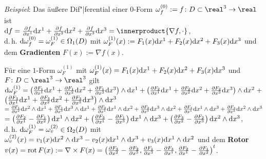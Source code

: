 \linie
\pagebreak

\emph{Beispiel}:
Das äußere Dif"|ferential einer $0$-Form
$\omega_f^{(0)} := f\colon D \subset \real^3 \rightarrow \real$ ist \\
$\d f = \frac{\partial f}{\partial x^1} \d x^1 +
\frac{\partial f}{\partial x^2} \d x^2 +
\frac{\partial f}{\partial x^3} \d x^3 = \innerproduct{\nabla f, \cdot}$, \\
d.\,h. $\mathrm{d} \omega_f^{(0)} = \omega_F^{(1)} \in \Omega_1(D)$ mit
$\omega_F^{(1)}(x) := F_1(x) \mathrm{d} x^1 + F_2(x) \mathrm{d} x^2 + F_3(x) \mathrm{d} x^3$ und
dem \textbf{Gradienten} $F(x) := \nabla f(x)$.

Für eine $1$-Form $\omega_F^{(1)}$ mit
$\omega_F^{(1)}(x) = F_1(x) \mathrm{d} x^1 + F_2(x) \mathrm{d} x^2 + F_3(x) \mathrm{d} x^3$ und
$F\colon D \subset \real^3 \rightarrow \real^3$ gilt
$\mathrm{d} \omega_F^{(1)} = \left(\frac{\partial F_1}{\partial x^1} \mathrm{d} x^1 +
\frac{\partial F_1}{\partial x^2} \mathrm{d} x^2 +
\frac{\partial F_1}{\partial x^3} \mathrm{d} x^3\right) \land \mathrm{d} x^1 +
\left(\frac{\partial F_2}{\partial x^1} \mathrm{d} x^1 +
\frac{\partial F_2}{\partial x^2} \mathrm{d} x^2 +
\frac{\partial F_2}{\partial x^3} \mathrm{d} x^3\right) \land \mathrm{d} x^2 \;+$ \\
$\left(\frac{\partial F_3}{\partial x^1} \mathrm{d} x^1 +
\frac{\partial F_3}{\partial x^2} \mathrm{d} x^2 +
\frac{\partial F_3}{\partial x^3} \mathrm{d} x^3\right) \land \mathrm{d} x^3$ \\
$= \frac{\partial F_1}{\partial x^2} \mathrm{d} x^2 \land \mathrm{d} x^1 +
\frac{\partial F_1}{\partial x^3} \mathrm{d} x^3 \land \mathrm{d} x^1 +
\frac{\partial F_2}{\partial x^1} \mathrm{d} x^1 \land \mathrm{d} x^2 +
\frac{\partial F_2}{\partial x^3} \mathrm{d} x^3 \land \mathrm{d} x^2 +
\frac{\partial F_3}{\partial x^1} \mathrm{d} x^1 \land \mathrm{d} x^3 +
\frac{\partial F_3}{\partial x^2} \mathrm{d} x^2 \land \mathrm{d} x^3$ \\
$= \left(\frac{\partial F_2}{\partial x^1} -
\frac{\partial F_1}{\partial x^2}\right) \mathrm{d} x^1 \land \mathrm{d} x^2 +
\left(\frac{\partial F_3}{\partial x^1} -
\frac{\partial F_1}{\partial x^3}\right) \mathrm{d} x^1 \land \mathrm{d} x^3 +
\left(\frac{\partial F_3}{\partial x^2} -
\frac{\partial F_2}{\partial x^3}\right) \mathrm{d} x^2 \land \mathrm{d} x^3$, \\
d.\,h. $\mathrm{d} \omega_F^{(1)} = \omega_v^{(2)} \in \Omega_2(D)$ mit
$\omega_v^{(2)}(x) = v_1(x) \mathrm{d} x^2 \land \mathrm{d} x^3 - v_2(x) \mathrm{d} x^1 \land
\mathrm{d} x^3 + v_3(x) \mathrm{d} x^1 \land \mathrm{d} x^2$ und
dem \textbf{Rotor} $v(x) = \operatorname{rot} F(x) := \nabla \times F(x) =
\left(\frac{\partial F_3}{\partial x^2} - \frac{\partial F_2}{\partial x^3},
\frac{\partial F_1}{\partial x^3} - \frac{\partial F_3}{\partial x^1},
\frac{\partial F_2}{\partial x^1} -
\frac{\partial F_1}{\partial x^2}\right)^t$.

